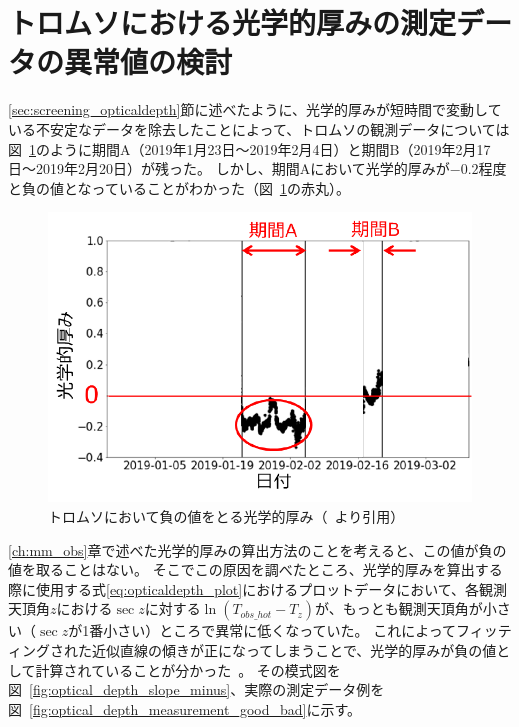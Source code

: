 \section{トロムソにおける光学的厚みの測定データの異常値の検討}
\label{sec:correction_opticaldepth}
\ref{sec:screening_opticaldepth}節に述べたように、光学的厚みが短時間で変動している不安定なデータを除去したことによって、トロムソの観測データについては図~\ref{fig:optical_depth_minus}のように期間A（2019年1月23日〜2019年2月4日）と期間B（2019年2月17日〜2019年2月20日）が残った。
しかし、期間Aにおいて光学的厚みが$-0.2$程度と負の値となっていることがわかった（図~\ref{fig:optical_depth_minus}の赤丸）。
\begin{figure}[htbp]
    \centering
    \includegraphics[width=\linewidth]{master_thesis_contents/master_thesis_fig/optical_depth_minus.pdf}
    \caption{トロムソにおいて負の値をとる光学的厚み（~\cite{goto2021bachelor}より引用）}
    \label{fig:optical_depth_minus}
\end{figure}
\ref{ch:mm_obs}章で述べた光学的厚みの算出方法のことを考えると、この値が負の値を取ることはない。
そこでこの原因を調べたところ、光学的厚みを算出する際に使用する式\eqref{eq:opticaldepth_plot}におけるプロットデータにおいて、各観測天頂角$z$における$\sec z$に対する$\ln \left( T_{obs\_ hot} - T_z \right)$が、もっとも観測天頂角が小さい（$\sec z$が1番小さい）ところで異常に低くなっていた。
これによってフィッティングされた近似直線の傾きが正になってしまうことで、光学的厚みが負の値として計算されていることが分かった~\cite{goto2021bachelor}。
その模式図を図~\ref{fig:optical_depth_slope_minus}、実際の測定データ例を図~\ref{fig:optical_depth_measurement_good_bad}に示す。\par

